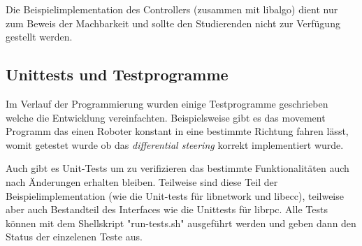 \documentclass[
    12pt,
    bibliography=totoc,
    ngerman,
    enabledeprecatedfontcommands
]{scrartcl}
\begin{document}
Die Beispielimplementation des Controllers (zusammen mit libalgo) dient nur zum Beweis der Machbarkeit und sollte den Studierenden nicht zur Verf{\"{u}}gung
gestellt werden.

\subsection{Unittests und Testprogramme}
Im Verlauf der Programmierung wurden einige Testprogramme geschrieben welche die Entwicklung vereinfachten. Beispielsweise gibt es das movement Programm das
einen Roboter konstant in eine bestimmte Richtung fahren l{\"{a}}sst, womit getestet wurde ob das \textit{differential steering} korrekt implementiert wurde.

Auch gibt es Unit-Tests um zu verifizieren das bestimmte Funktionalit{\"{a}}ten auch nach {\"{A}}nderungen erhalten bleiben. Teilweise sind diese Teil der
Beispielimplementation (wie die Unit-tests f{\"{u}}r libnetwork und libecc), teilweise aber auch Bestandteil des Interfaces wie die Unittests f{\"{u}}r librpc.
Alle Tests k{\"{o}}nnen mit dem Shellskript "run-tests.sh" ausgef{\"{u}}hrt werden und geben dann den Status der einzelenen Teste aus.
\end{document}
